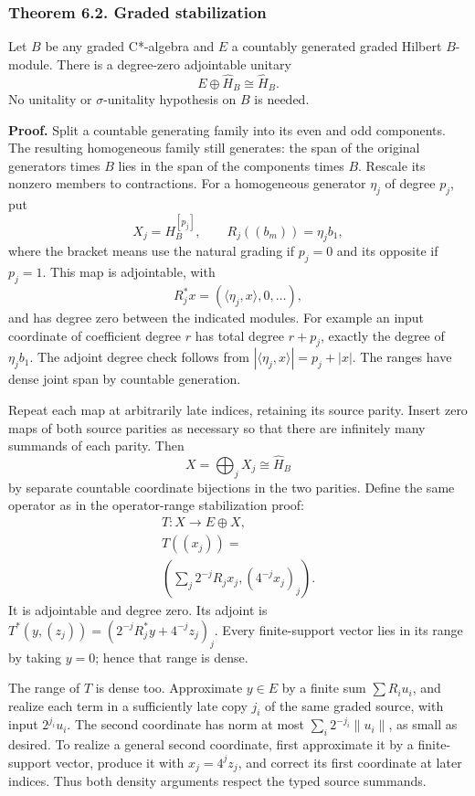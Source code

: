 \documentclass[
  11pt,
]{article}
\begin{document}
\subsubsection{Theorem 6.2. Graded
stabilization}\label{theorem-6.2.-graded-stabilization}

Let \(B\) be any graded C*-algebra and \(E\) a countably generated
graded Hilbert \(B\)-module. There is a degree-zero adjointable unitary
\[
E\oplus\widehat H_B\cong\widehat H_B.
\tag{6.2}
\] No unitality or \(\sigma\)-unitality hypothesis on \(B\) is needed.

\textbf{Proof.} Split a countable generating family into its even and
odd components. The resulting homogeneous family still generates: the
span of the original generators times \(B\) lies in the span of the
components times \(B\). Rescale its nonzero members to contractions. For
a homogeneous generator \(\eta_j\) of degree \(p_j\), put \[
X_j=H_B^{[p_j]},\qquad
R_j((b_m))=\eta_jb_1,
\tag{6.3}
\] where the bracket means use the natural grading if \(p_j=0\) and its
opposite if \(p_j=1\). This map is adjointable, with \[
R_j^*x=(\langle\eta_j,x\rangle,0,\ldots),
\] and has degree zero between the indicated modules. For example an
input coordinate of coefficient degree \(r\) has total degree \(r+p_j\),
exactly the degree of \(\eta_jb_1\). The adjoint degree check follows
from \(|\langle\eta_j,x\rangle|=p_j+|x|\). The ranges have dense joint
span by countable generation.

Repeat each map at arbitrarily late indices, retaining its source
parity. Insert zero maps of both source parities as necessary so that
there are infinitely many summands of each parity. Then \[
X=\bigoplus_jX_j\cong\widehat H_B
\tag{6.4}
\] by separate countable coordinate bijections in the two parities.
Define the same operator as in the operator-range stabilization proof:
\[
\begin{gathered}
T:X\to E\oplus X,\\
T((x_j))=\\
\left(\sum_j2^{-j}R_jx_j,(4^{-j}x_j)_j\right).
\end{gathered}
\tag{6.5}
\] It is adjointable and degree zero. Its adjoint is
\(T^*(y,(z_j))=(2^{-j}R_j^*y+4^{-j}z_j)_j\). Every finite-support vector
lies in its range by taking \(y=0\); hence that range is dense.

The range of \(T\) is dense too. Approximate \(y\in E\) by a finite sum
\(\sum R_iu_i\), and realize each term in a sufficiently late copy
\(j_i\) of the same graded source, with input \(2^{j_i}u_i\). The second
coordinate has norm at most \(\sum_i2^{-j_i}\|u_i\|\), as small as
desired. To realize a general second coordinate, first approximate it by
a finite-support vector, produce it with \(x_j=4^jz_j\), and correct its
first coordinate at later indices. Thus both density arguments respect
the typed source summands.
\end{document}
